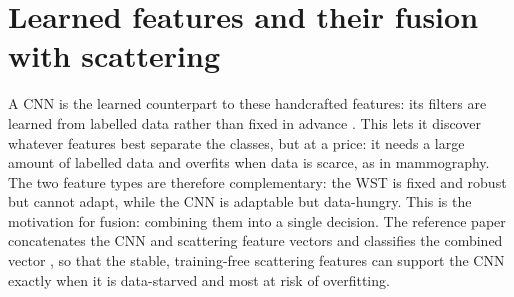 \section{Learned features and their fusion with scattering} \label{sec:cnns-bg}

A CNN is the learned counterpart to these handcrafted features: its filters are learned from labelled data rather than fixed in advance \cite{lecun1998gradient, he2016deep}. This lets it discover whatever features best separate the classes, but at a price: it needs a large amount of labelled data and overfits when data is scarce, as in mammography. The two feature types are therefore complementary: the WST is fixed and robust but cannot adapt, while the CNN is adaptable but data-hungry. This is the motivation for fusion: combining them into a single decision. The reference paper concatenates the CNN and scattering feature vectors and classifies the combined vector \cite{razali2023cnn}, so that the stable, training-free scattering features can support the CNN exactly when it is data-starved and most at risk of overfitting.


